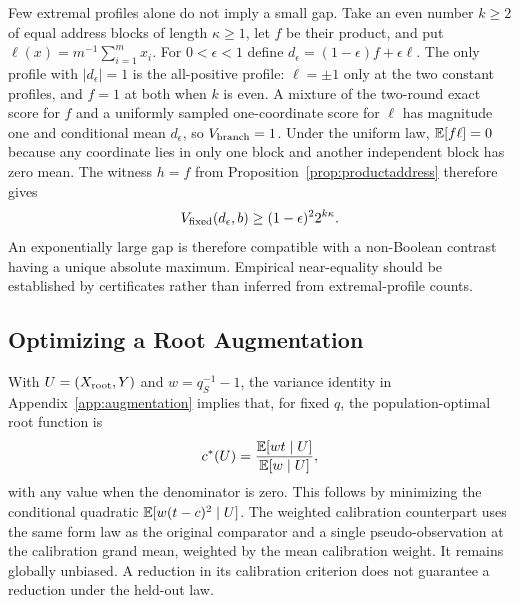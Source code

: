 Few extremal profiles alone do not imply a small gap. Take an even number $k\ge2$ of equal address blocks of length $\kappa\ge1$, let $f$ be their product, and put $\ell(x)=m^{-1}\sum_{i=1}^m x_i$. For $0<\epsilon<1$ define $d_\epsilon=(1-\epsilon)f+\epsilon\ell$. The only profile with $|d_\epsilon|=1$ is the all-positive profile: $\ell=\pm1$ only at the two constant profiles, and $f=1$ at both when $k$ is even. A mixture of the two-round exact score for $f$ and a uniformly sampled one-coordinate score for $\ell$ has magnitude one and conditional mean $d_\epsilon$, so $V_{\rm branch}=1$. Under the uniform law, $\mathbb{E}[f\ell]=0$ because any coordinate lies in only one block and another independent block has zero mean. The witness $h=f$ from Proposition~\ref{prop:productaddress} therefore gives
\[
 V_{\rm fixed}(d_\epsilon,b)\ge(1-\epsilon)^2 2^{k\kappa}.
\]
An exponentially large gap is therefore compatible with a non-Boolean contrast having a unique absolute maximum. Empirical near-equality should be established by certificates rather than inferred from extremal-profile counts.

\subsection{Optimizing a Root Augmentation}\label{app:weightedroot}
With $U=(X_{\rm root},Y)$ and $w=q_S^{-1}-1$, the variance identity in Appendix~\ref{app:augmentation} implies that, for fixed $q$, the population-optimal root function is
\[
 c^*(U)=\frac{\mathbb{E}[wt\mid U]}{\mathbb{E}[w\mid U]},
\]
with any value when the denominator is zero. This follows by minimizing the conditional quadratic $\mathbb{E}[w(t-c)^2\mid U]$. The weighted calibration counterpart uses the same form law as the original comparator and a single pseudo-observation at the calibration grand mean, weighted by the mean calibration weight. It remains globally unbiased. A reduction in its calibration criterion does not guarantee a reduction under the held-out law.
